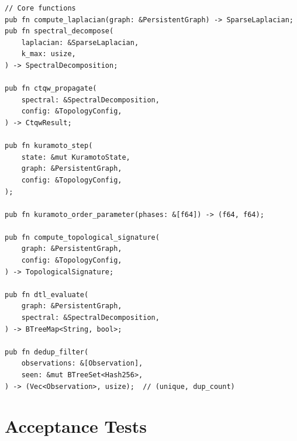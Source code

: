 \documentclass[11pt,a4paper,twoside]{article}
\theoremstyle{definition}
\theoremstyle{plain}
\theoremstyle{remark}
\begin{document}
\begin{verbatim}
// Core functions
pub fn compute_laplacian(graph: &PersistentGraph) -> SparseLaplacian;
pub fn spectral_decompose(
    laplacian: &SparseLaplacian,
    k_max: usize,
) -> SpectralDecomposition;

pub fn ctqw_propagate(
    spectral: &SpectralDecomposition,
    config: &TopologyConfig,
) -> CtqwResult;

pub fn kuramoto_step(
    state: &mut KuramotoState,
    graph: &PersistentGraph,
    config: &TopologyConfig,
);

pub fn kuramoto_order_parameter(phases: &[f64]) -> (f64, f64);

pub fn compute_topological_signature(
    graph: &PersistentGraph,
    config: &TopologyConfig,
) -> TopologicalSignature;

pub fn dtl_evaluate(
    graph: &PersistentGraph,
    spectral: &SpectralDecomposition,
) -> BTreeMap<String, bool>;

pub fn dedup_filter(
    observations: &[Observation],
    seen: &mut BTreeSet<Hash256>,
) -> (Vec<Observation>, usize);  // (unique, dup_count)
\end{verbatim}


\section{Acceptance Tests}\label{sec:topo:tests}
\end{document}
